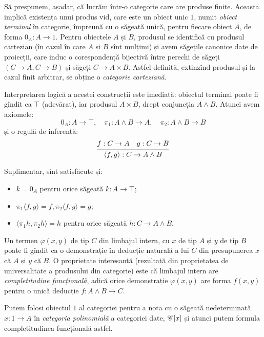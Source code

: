 \documentclass[a4paper]{article}
\begin{document}
Să prespunem, așadar, că lucrăm într-o categorie care are produse finite.
Aceasta implică existența unui produs vid, care este un obiect unic $ 1 $,
numit \emph{obiect terminal} în categorie, împreună cu o săgeată unică,
pentru fiecare obiect $ A $, de forma $ 0_A : A \to 1 $. Pentru obiectele
$ A $ și $ B $, produsul se identifică cu produsul cartezian (în cazul în care
$ A $ și $ B $ sînt mulțimi) și avem săgețile canonice date de proiecții,
care induc o corespondență bijectivă între perechi de săgeți $ (C \to A, C \to B )$
și săgeți $ C \to A \times B $. Astfel definită, extinzînd produsul și la
cazul finit arbitrar, se obține o \emph{categorie carteziană}.

Interpretarea logică a acestei construcții este imediată: obiectul terminal poate
fi gîndit ca $ \top $ (adevărat), iar produsul $ A \times B $, drept
conjuncția $ A \land B $. Atunci avem axiomele:
\[
  0_A : A \to \top, \quad \pi_1 : A \land B \to A, \quad \pi_2 : A \land B \to B
\]
și o regulă de inferență:
\[
  \begin{prooftree}
    \hypo{f : C \to A \quad g : C \to B}
    \infer1{\langle f, g \rangle : C \to A \land B}
  \end{prooftree}
\]

Suplimentar, sînt satisfăcute și:
\begin{itemize}
  \item $ k = 0_A $ pentru orice săgeată $ k : A \to \top $;
  \item $ \pi_1 \langle f, g \rangle = f, \pi_2 \langle f, g \rangle = g $;
  \item $ \langle \pi_1 h, \pi_2 h \rangle = h $ pentru orice săgeată $ h : C \to A \land B $.
\end{itemize}

Un termen $ \varphi(x, y) $ de tip $ C $ din limbajul intern, cu $ x $ de tip $ A $
și $ y $ de tip $ B $ poate fi gîndit ca o demonstrație în deducție naturală
a lui $ C $ din presupunerea $ x $ că $ A $ și $ y $ că $ B $. O proprietate
interesantă (rezultată din proprietatea de universalitate a produsului din categorie)
este că limbajul intern are \emph{completitudine funcțională}, adică orice
demonstrație $ \varphi(x, y) $ are forma $ f(x, y) $ pentru o unică deducție
$ f : A \land B \to C $.

Putem folosi obiectul $ 1 $ al categoriei pentru a nota cu o săgeată nedeterminată
$ x : 1 \to A $ în \emph{categoria polinomială}\footnotemark
a categoriei date, $ \mathscr{C}[x] $
și atunci putem formula completitudinea funcțională astfel.
\end{document}
